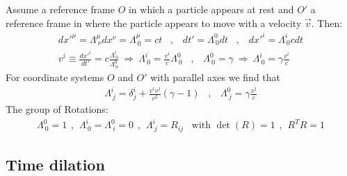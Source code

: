 Assume a reference frame $O$ in which a particle appears at rest and $O'$
a reference frame in where the particle appears to move with a velocity
$\vec{v}$. Then:
\begin{align*}
    dx'^\mu = \Lambda_{\ \nu}^\mu dx^\nu = \Lambda_{\ 0}^\mu = ct
    \hspace{10pt} , \hspace{10pt}
    dt' = \Lambda_{\ 0}^0 dt
    \hspace{10pt} , \hspace{10pt}
    dx'^i = \Lambda_{\ 0}^i c dt
    \\
    v^i \equiv \frac{dx'^i}{dt'} = c \frac{\Lambda_{\ 0}^i}{\Lambda_{\ 0}^0}
    \ \Rightarrow \ \Lambda_{\ 0}^i = \frac{v^i}{c} \Lambda_{\ 0}^0
    \hspace{10pt} , \hspace{10pt}
    \Lambda_{\ 0}^0 = \gamma
    \ \Rightarrow \ \Lambda_{\ 0}^i = \gamma \frac{v^i}{c}
\end{align*}
For coordinate systems $O$ and $O'$ with parallel axes we find that
\begin{align*}
    \Lambda_{\ j}^i = \delta_j^i + \frac{v^i v^j}{v^2} (\gamma - 1)
    \hspace{10pt} , \hspace{10pt}
    \Lambda_{\ j}^0 = \gamma \frac{v^j}{c}
\end{align*}
The group of Rotations:
\begin{align*}
    \Lambda_{\ 0}^0 = 1
    \hspace{5pt} , \hspace{5pt}
    \Lambda_{\ 0}^i = \Lambda_{\ i}^0 = 0
    \hspace{5pt} , \hspace{5pt}
    \Lambda_{\ j}^i = R_{ij}
    \hspace{10pt}
    \text{with } \det(R) = 1
    \hspace{5pt} , \hspace{5pt}
    R^T R = 1
\end{align*}

\subsection{Time dilation}

